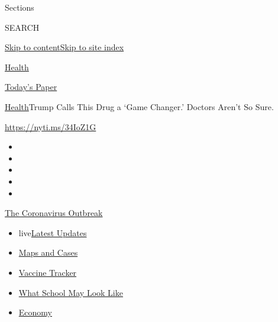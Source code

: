 Sections

SEARCH

\protect\hyperlink{site-content}{Skip to
content}\protect\hyperlink{site-index}{Skip to site index}

\href{https://www.nytimes.com/section/health}{Health}

\href{https://myaccount.nytimes.com/auth/login?response_type=cookie\&client_id=vi}{}

\href{https://www.nytimes.com/section/todayspaper}{Today's Paper}

\href{/section/health}{Health}\textbar{}Trump Calls This Drug a `Game
Changer.' Doctors Aren't So Sure.

\url{https://nyti.ms/34IoZ1G}

\begin{itemize}
\item
\item
\item
\item
\item
\end{itemize}

\href{https://www.nytimes.com/news-event/coronavirus?action=click\&pgtype=Article\&state=default\&region=TOP_BANNER\&context=storylines_menu}{The
Coronavirus Outbreak}

\begin{itemize}
\tightlist
\item
  live\href{https://www.nytimes.com/2020/08/01/world/coronavirus-covid-19.html?action=click\&pgtype=Article\&state=default\&region=TOP_BANNER\&context=storylines_menu}{Latest
  Updates}
\item
  \href{https://www.nytimes.com/interactive/2020/us/coronavirus-us-cases.html?action=click\&pgtype=Article\&state=default\&region=TOP_BANNER\&context=storylines_menu}{Maps
  and Cases}
\item
  \href{https://www.nytimes.com/interactive/2020/science/coronavirus-vaccine-tracker.html?action=click\&pgtype=Article\&state=default\&region=TOP_BANNER\&context=storylines_menu}{Vaccine
  Tracker}
\item
  \href{https://www.nytimes.com/interactive/2020/07/29/us/schools-reopening-coronavirus.html?action=click\&pgtype=Article\&state=default\&region=TOP_BANNER\&context=storylines_menu}{What
  School May Look Like}
\item
  \href{https://www.nytimes.com/live/2020/07/31/business/stock-market-today-coronavirus?action=click\&pgtype=Article\&state=default\&region=TOP_BANNER\&context=storylines_menu}{Economy}
\end{itemize}

